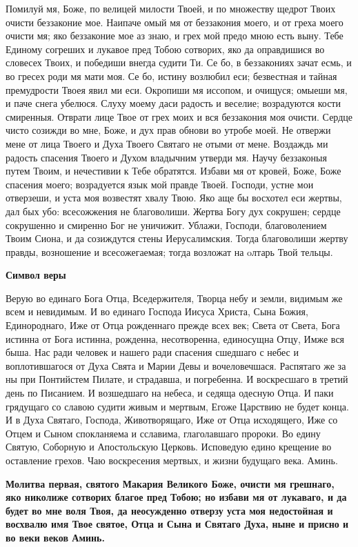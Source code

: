 Помилуй мя, Боже, по велицей милости Твоей, и по множеству щедрот Твоих очисти беззаконие мое. Наипаче омый мя от беззакония моего, и от греха моего очисти мя; яко беззаконие мое аз знаю, и грех мой предо мною есть выну. Тебе Единому согреших и лукавое пред Тобою сотворих, яко да оправдишися во словесех Твоих, и победиши внегда судити Ти. Се бо, в беззакониях зачат есмь, и во гресех роди мя мати моя. Се бо, истину возлюбил еси; безвестная и тайная премудрости Твоея явил ми еси. Окропиши мя иссопом, и очищуся; омыеши мя, и паче снега убелюся. Слуху моему даси радость и веселие; возрадуются кости смиренныя. Отврати лице Твое от грех моих и вся беззакония моя очисти. Сердце чисто созижди во мне, Боже, и дух прав обнови во утробе моей. Не отвержи мене от лица Твоего и Духа Твоего Святаго не отыми от мене. Воздаждь ми радость спасения Твоего и Духом владычним утверди мя. Научу беззаконыя путем Твоим, и нечестивии к Тебе обратятся. Избави мя от кровей, Боже, Боже спасения моего; возрадуется язык мой правде Твоей. Господи, устне мои отверзеши, и уста моя возвестят хвалу Твою. Яко аще бы восхотел еси жертвы, дал бых убо: всесожжения не благоволиши. Жертва Богу дух сокрушен; сердце сокрушенно и смиренно Бог не уничижит. Ублажи, Господи, благоволением Твоим Сиона, и да созиждутся стены Иерусалимския. Тогда благоволиши жертву правды, возношение и всесожегаемая; тогда возложат на oлтарь Твой тельцы.


\medskip
\bfseries Символ веры\normalfont{}


  Верую во единаго Бога Отца, Вседержителя, Творца небу и земли, видимым же всем и невидимым.
  И во единаго Господа Иисуса Христа, Сына Божия, Единороднаго, Иже от Отца рожденнаго прежде всех век; Света от Света, Бога истинна от Бога истинна, рожденна, несотворенна, единосущна Отцу, Имже вся быша.
  Нас ради человек и нашего ради спасения сшедшаго с небес и воплотившагося от Духа Свята и Марии Девы и вочеловечшася.
  Распятаго же за ны при Понтийстем Пилате, и страдавша, и погребенна.
  И воскресшаго в третий день по Писанием.
  И возшедшаго на небеса, и седяща одесную Отца.
  И паки грядущаго со славою судити живым и мертвым, Егоже Царствию не будет конца.
  И в Духа Святаго, Господа, Животворящаго, Иже от Отца исходящего, Иже со Отцем и Сыном спокланяема и сславима, глаголавшаго пророки.
  Во едину Святую, Соборную и Апостольскую Церковь.
  Исповедую едино крещение во оставление грехов.
  Чаю воскресения мертвых, и жизни будущаго века. Аминь.
  

\medskip
\bfseries Молитва первая, святого Макария Великого\normalfont{}
Боже, очисти мя грешнаго, яко николиже сотворих благое пред Тобою; но избави мя от лукаваго, и да будет во мне воля Твоя, да неосужденно отверзу уста моя недостойная и восхвалю имя Твое святое, Отца и Сына и Святаго Духа, ныне и присно и во веки веков Аминь. 


